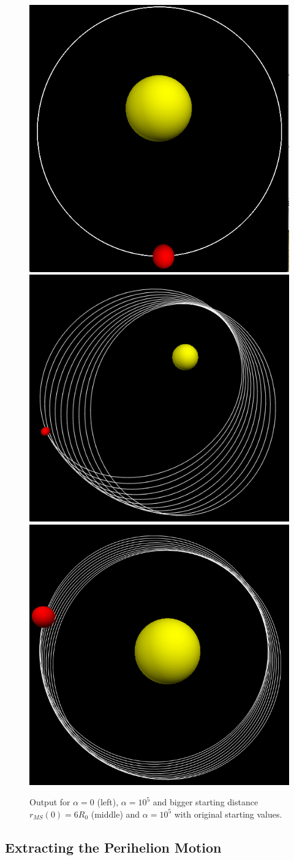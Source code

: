 \documentclass[12pt, UK english]{iopart}
\begin{document}
\begin{figure}[htb]
	\centering
	\includegraphics[width=.25\textwidth]{figs/MercuryOrbit.png} \quad
	\includegraphics[width=.273\textwidth]{figs/PerihelionMotionLargeV.png} \quad
	\includegraphics[width=.26\textwidth]{figs/PerihelionMotion.png}
	\caption{\label{fig:MercuryOrbit} Output for $\alpha=0$ (left), $\alpha=10^5$ and bigger starting distance $r_{MS}(0)=6R_0$ (middle) and $\alpha=10^5$ with original starting values.}
\end{figure}

\subsection{Extracting the Perihelion Motion}

\end{document}
